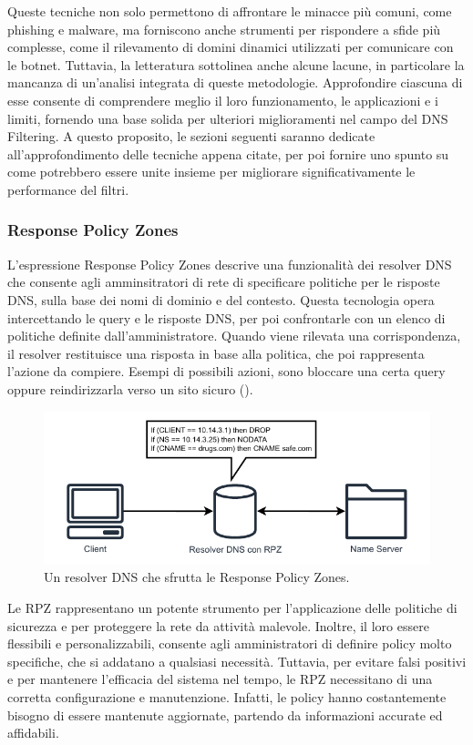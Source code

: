 Queste tecniche non solo permettono di affrontare le minacce più comuni, come phishing e malware, ma forniscono anche strumenti per rispondere a sfide più complesse, come il rilevamento di domini dinamici utilizzati per comunicare con le botnet. Tuttavia, la letteratura sottolinea anche alcune lacune, in particolare la mancanza di un'analisi integrata di queste metodologie. Approfondire ciascuna di esse consente di comprendere meglio il loro funzionamento, le applicazioni e i limiti, fornendo una base solida per ulteriori miglioramenti nel campo del DNS Filtering. A questo proposito, le sezioni seguenti saranno dedicate all'approfondimento delle tecniche appena citate, per poi fornire uno spunto su come potrebbero essere unite insieme per migliorare significativamente le performance del filtri.

\subsubsection{Response Policy Zones}
L'espressione Response Policy Zones descrive una funzionalità dei resolver DNS che consente agli amminsitratori di rete di specificare politiche per le risposte DNS, sulla base dei nomi di dominio e del contesto. Questa tecnologia opera intercettando le query e le risposte DNS, per poi confrontarle con un elenco di politiche definite dall'amministratore. Quando viene rilevata una corrispondenza, il resolver restituisce una risposta in base alla politica, che poi rappresenta l'azione da compiere. Esempi di possibili azioni, sono bloccare una certa query oppure reindirizzarla verso un sito sicuro ().

\begin{figure}
  \centering
  \includegraphics[width=1.0\linewidth]{figures/Response_Policy_zones.pdf}
  \caption{Un resolver DNS che sfrutta le Response Policy Zones.}
  \label{fig:rpz}
\end{figure}

Le RPZ rappresentano un potente strumento per l'applicazione delle politiche di sicurezza e per proteggere la rete da attività malevole. Inoltre, il loro essere flessibili e personalizzabili, consente agli amministratori di definire policy molto specifiche, che si addatano a qualsiasi necessità. Tuttavia, per evitare falsi positivi e per mantenere l'efficacia del sistema nel tempo, le RPZ necessitano di una corretta configurazione e manutenzione. Infatti, le policy hanno costantemente bisogno di essere mantenute aggiornate, partendo da informazioni accurate ed affidabili.

